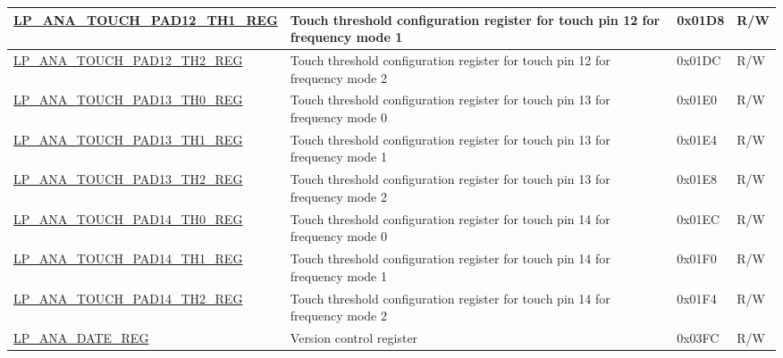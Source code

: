 \begin{longtable}{ | l | p{12cm} | p{1.3cm} | p{1.2cm} | }
\hyperref[regdesc:LPANATOUCHPAD0TH1REG]{LP\_ANA\_TOUCH\_PAD12\_TH1\_REG} & Touch threshold configuration register for touch pin 12 for frequency mode 1  & 0x01D8 & R/W \\ \hline
\hyperref[regdesc:LPANATOUCHPAD0TH2REG]{LP\_ANA\_TOUCH\_PAD12\_TH2\_REG} & Touch threshold configuration register for touch pin 12 for frequency mode 2 & 0x01DC & R/W \\ \hline
\hyperref[regdesc:LPANATOUCHPAD0TH0REG]{LP\_ANA\_TOUCH\_PAD13\_TH0\_REG} & Touch threshold configuration register for touch pin 13 for frequency mode 0 & 0x01E0 & R/W \\ \hline
\hyperref[regdesc:LPANATOUCHPAD0TH1REG]{LP\_ANA\_TOUCH\_PAD13\_TH1\_REG} & Touch threshold configuration register for touch pin 13 for frequency mode 1 & 0x01E4 & R/W \\ \hline
\hyperref[regdesc:LPANATOUCHPAD0TH2REG]{LP\_ANA\_TOUCH\_PAD13\_TH2\_REG} & Touch threshold configuration register for touch pin 13 for frequency mode 2 & 0x01E8 & R/W \\ \hline
\hyperref[regdesc:LPANATOUCHPAD0TH0REG]{LP\_ANA\_TOUCH\_PAD14\_TH0\_REG} & Touch threshold configuration register for touch pin 14 for frequency mode 0 & 0x01EC & R/W \\ \hline
\hyperref[regdesc:LPANATOUCHPAD0TH1REG]{LP\_ANA\_TOUCH\_PAD14\_TH1\_REG} & Touch threshold configuration register for touch pin 14 for frequency mode 1 & 0x01F0 & R/W \\ \hline
\hyperref[regdesc:LPANATOUCHPAD0TH2REG]{LP\_ANA\_TOUCH\_PAD14\_TH2\_REG} & Touch threshold configuration register for touch pin 14 for frequency mode 2 & 0x01F4 & R/W \\ \hline
\hyperref[regdesc:LPANADATEREG]{LP\_ANA\_DATE\_REG} & Version control register & 0x03FC & R/W \\ \hline
\end{longtable}
